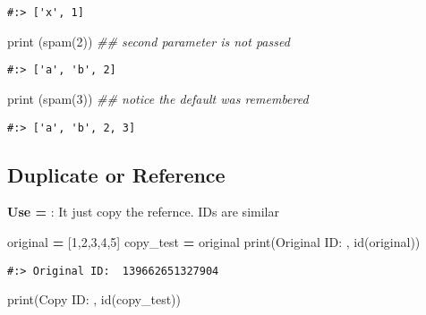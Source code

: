 \documentclass[
]{book}
\newenvironment{Shaded}{\begin{snugshade}}{\end{snugshade}}
\newcommand{\BuiltInTok}[1]{#1}
\newcommand{\CommentTok}[1]{\textcolor[rgb]{0.37,0.37,0.37}{\textit{#1}}}
\newcommand{\DecValTok}[1]{\textcolor[rgb]{0.06,0.06,0.06}{#1}}
\newcommand{\NormalTok}[1]{#1}
\newcommand{\OperatorTok}[1]{\textcolor[rgb]{0.43,0.43,0.43}{\textbf{#1}}}
\newcommand{\StringTok}[1]{\textcolor[rgb]{0.5,0.5,0.5}{#1}}
\begin{document}
\begin{verbatim}
#:> ['x', 1]
\end{verbatim}

\begin{Shaded}
\begin{Highlighting}[]
\BuiltInTok{print}\NormalTok{ (spam(}\DecValTok{2}\NormalTok{)) }\CommentTok{\#\# second parameter is not passed}
\end{Highlighting}
\end{Shaded}

\begin{verbatim}
#:> ['a', 'b', 2]
\end{verbatim}

\begin{Shaded}
\begin{Highlighting}[]
\BuiltInTok{print}\NormalTok{ (spam(}\DecValTok{3}\NormalTok{)) }\CommentTok{\#\#  notice the default was remembered}
\end{Highlighting}
\end{Shaded}

\begin{verbatim}
#:> ['a', 'b', 2, 3]
\end{verbatim}

\hypertarget{duplicate-or-reference}{%
\subsection{Duplicate or Reference}\label{duplicate-or-reference}}

\textbf{Use =} : It just copy the refernce. IDs are similar

\begin{Shaded}
\begin{Highlighting}[]
\NormalTok{original }\OperatorTok{=}\NormalTok{ [}\DecValTok{1}\NormalTok{,}\DecValTok{2}\NormalTok{,}\DecValTok{3}\NormalTok{,}\DecValTok{4}\NormalTok{,}\DecValTok{5}\NormalTok{]}
\NormalTok{copy\_test }\OperatorTok{=}\NormalTok{ original}
\BuiltInTok{print}\NormalTok{(}\StringTok{\textquotesingle{}Original ID: \textquotesingle{}}\NormalTok{, }\BuiltInTok{id}\NormalTok{(original))}
\end{Highlighting}
\end{Shaded}

\begin{verbatim}
#:> Original ID:  139662651327904
\end{verbatim}

\begin{Shaded}
\begin{Highlighting}[]
\BuiltInTok{print}\NormalTok{(}\StringTok{\textquotesingle{}Copy ID:     \textquotesingle{}}\NormalTok{, }\BuiltInTok{id}\NormalTok{(copy\_test))                          }
\end{Highlighting}
\end{Shaded}
\end{document}
